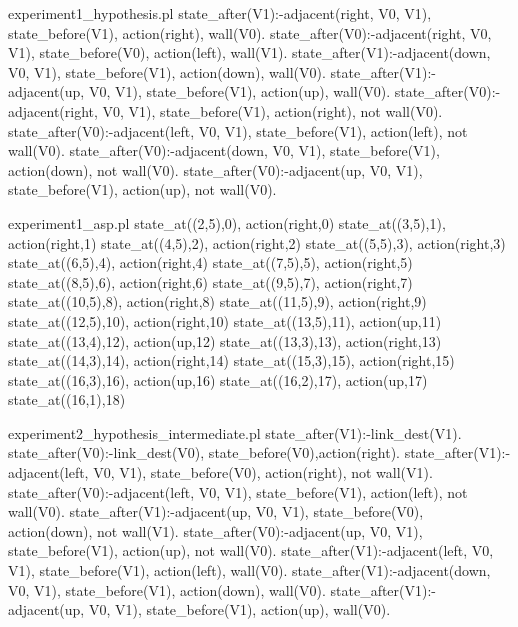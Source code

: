 \begin{filecontents*}{experiment1_hypothesis.pl}
state_after(V1):-adjacent(right, V0, V1), state_before(V1), 
                   action(right), wall(V0).
state_after(V0):-adjacent(right, V0, V1), state_before(V0), 
                   action(left), wall(V1).
state_after(V1):-adjacent(down, V0, V1), state_before(V1), 
                   action(down), wall(V0).
state_after(V1):-adjacent(up, V0, V1), state_before(V1), 
                   action(up), wall(V0).
state_after(V0):-adjacent(right, V0, V1), state_before(V1), 
                   action(right), not wall(V0).
state_after(V0):-adjacent(left, V0, V1), state_before(V1), 
                   action(left), not wall(V0).
state_after(V0):-adjacent(down, V0, V1), state_before(V1), 
                   action(down), not wall(V0).
state_after(V0):-adjacent(up, V0, V1), state_before(V1), 
                   action(up), not wall(V0).
\end{filecontents*}

\begin{filecontents*}{experiment1_asp.pl}
state_at((2,5),0), action(right,0)
state_at((3,5),1), action(right,1)
state_at((4,5),2), action(right,2)
state_at((5,5),3), action(right,3)
state_at((6,5),4), action(right,4)
state_at((7,5),5), action(right,5)
state_at((8,5),6), action(right,6)
state_at((9,5),7), action(right,7)
state_at((10,5),8), action(right,8)
state_at((11,5),9), action(right,9)
state_at((12,5),10), action(right,10)
state_at((13,5),11), action(up,11)
state_at((13,4),12), action(up,12)
state_at((13,3),13), action(right,13)
state_at((14,3),14), action(right,14)
state_at((15,3),15), action(right,15)
state_at((16,3),16), action(up,16)
state_at((16,2),17), action(up,17)
state_at((16,1),18)
\end{filecontents*}

\begin{filecontents*}{experiment2_hypothesis_intermediate.pl}
state_after(V1):-link_dest(V1).
state_after(V0):-link_dest(V0), state_before(V0),action(right).
state_after(V1):-adjacent(left, V0, V1), state_before(V0), 
                 action(right), not wall(V1).
state_after(V0):-adjacent(left, V0, V1), state_before(V1), 
                 action(left), not wall(V0).
state_after(V1):-adjacent(up, V0, V1), state_before(V0), 
                 action(down), not wall(V1).
state_after(V0):-adjacent(up, V0, V1), state_before(V1), 
                 action(up), not wall(V0).
state_after(V1):-adjacent(left, V0, V1), state_before(V1), 
                 action(left), wall(V0).
state_after(V1):-adjacent(down, V0, V1), state_before(V1), 
                 action(down), wall(V0).
state_after(V1):-adjacent(up, V0, V1), state_before(V1), 
                 action(up), wall(V0).
\end{filecontents*}

